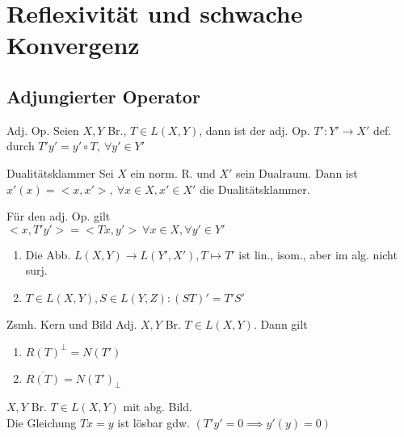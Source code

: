 \section{Reflexivität und schwache Konvergenz}

\subsection{Adjungierter Operator}

\begin{definition}{Adj. Op.}
    Seien \(X,Y\) Br., \(T\in L(X,Y)\), dann ist der adj. Op. \(T':Y'\to X'\)
    def. durch \(T'y' = y' \circ T,\ \forall y'\in Y'\)
\end{definition}

\begin{definition}{Dualitätsklammer}
    Sei \(X\) ein norm. R. und \(X'\) sein Dualraum.
    Dann ist \(x'(x) = <x,x'>,\ \forall x\in X, x'\in X'\)
    die Dualitätsklammer.
\end{definition}

\begin{bemerkung}
    Für den adj. Op. gilt\\
    \(<x,T'y'> = <Tx,y'>\ 
    \forall x\in X,\forall y'\in Y'\)
\end{bemerkung}

\begin{bemerkung}
    \begin{enumerate}[label =(\roman*)]
        \item Die Abb. \(L(X,Y) \to L(Y',X'), T \mapsto T'\) ist lin., isom.,
            aber im alg. nicht surj.
        \item \(T\in L(X,Y), S\in L(Y,Z): (ST)'=T'S'\)
    \end{enumerate}
\end{bemerkung}

\begin{satz}{Zsmh. Kern und Bild Adj.}
    \(X,Y\) Br. \(T\in L(X,Y)\). Dann gilt
    \begin{enumerate}[label = (\roman*)]
        \item \(R(T)^\perp = N(T')\)
        \item \(\overline{R(T)} = N(T')_\perp\)
    \end{enumerate}
\end{satz}

\begin{korrolar}
    \(X,Y\) Br. \(T\in L(X,Y)\) mit abg. Bild.\\
    Die Gleichung \(Tx=y\) ist lösbar gdw. \((T'y' = 0 \implies y'(y) = 0)\)
\end{korrolar}


